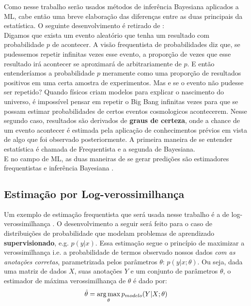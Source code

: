 Como nesse trabalho serão usados métodos de inferência Bayesiana aplicados a ML,
cabe então uma breve elaboração das diferenças entre as duas principais da estatística. O seguinte desenvolvimento é retirado de \cite{dlbook}:\\

Digamos que exista um evento aleatório que tenha um resultado com probabilidade
$p$ de acontecer. A visão frequentista de probabilidades diz que, se pudessemos repetir infinitas vezes esse evento, a proporção de vezes que esse resultado irá acontecer se aproximará de arbitrariamente de $p$. E então entenderíamos a probabilidade $p$ meramente como uma proporção de resultados positivos em uma certa amostra de experimentos. Mas e se o evento não pudesse ser repetido? Quando físicos criam modelos para explicar o nascimento do universo, é impossível pensar em repetir o Big Bang infinitas vezes para que se possam estimar probabilidades de certos eventos cosmologicos acontecerem. Nesse segundo caso, resultados são derivados de \textbf{graus de certeza}, onde a chance de um evento acontecer é estimada pela aplicação de conhecimentos prévios em vista de algo que foi observado posteriormente. A primeira maneira de se entender estatística é chamada de Frequentista e a segunda de Bayesiana. \\

E no campo de ML, as duas maneiras de se gerar predições são estimadores frequentistas e inferência Bayesiana \citep{dlbook}.

\subsection{Estimação por Log-verossimilhança}
 
Um exemplo de estimação frequentista que será usada nesse trabalho é a de
log-verossimilhança \citep{dlbook}. O desenvolvimento a seguir será feito para o
caso de distribuições de probabilidade que modelam problemas de aprendizado
\textbf{supervisionado}, e.g. $p(y|x)$. 
Essa estimação segue o princípio de maximizar a verossimilhança i.e. a probabilidade de
termos observado nossos dados \textit{com as anotações corretas}, parametrizada pelos parâmetros $\theta$: $p(y|x ; \theta)$.
Ou seja, dada uma matriz de dados $X$, suas anotações $Y$ e um conjunto de parâmetros $\theta$, o estimador de máxima verossimilhança de $\theta$ é dado por: \\

\[ \hat{\theta} = \operatorname*{arg\,max}_{\theta} p_{modelo}(Y | X;\theta) \] 

